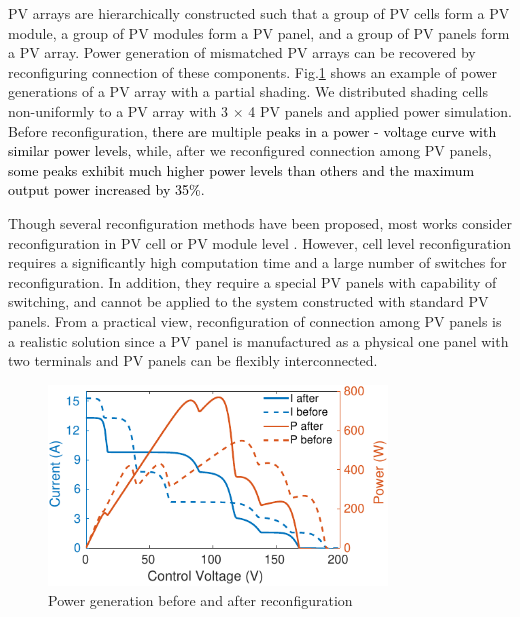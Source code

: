 \documentclass[conference]{pvsctran}
\newcommand{\michiko}{\textcolor{black}}
\newcommand{\zhao}{\textcolor{black}}
\begin{document}

PV arrays are hierarchically constructed such that a group of PV cells form a PV module, a group of PV modules form a PV panel, and a group of PV panels form a PV array. 
Power generation of mismatched PV arrays can be recovered by reconfiguring connection of these components. 
Fig.\ref{compare} shows an example of power generations of a PV array with a partial shading. 
We distributed shading cells non-uniformly to a PV array with 3 $\times$  4 PV panels and applied power simulation. 
Before reconfiguration, \michiko{there are} multiple \michiko{peaks in a power - voltage curve with similar power levels,} while, after we reconfigured connection among PV panels, 
\michiko{some peaks exhibit much higher power levels than others and the }%
\zhao{maximum output power increased by 35\%}.

Though several reconfiguration methods have been proposed, most works consider reconfiguration in PV cell or PV module level \cite{nguyen2008adaptive,wang2014architecture,storey2013improved,storey2014optimized,udenze2018reconfiguration}. 
However, cell level reconfiguration requires a significantly high computation time and a large number of switches for reconfiguration. 
In addition, they require a special PV panels with capability of switching, and cannot be applied to the system constructed with standard PV panels. 
From a practical view, reconfiguration of connection among PV panels is a realistic solution since a PV panel is manufactured as a physical one panel with two terminals and PV panels can be flexibly interconnected. 
\begin{figure}[t]
\centering
\includegraphics[width=9cm]{../fig/compare.png}
\caption{Power generation before and after reconfiguration}
\label{compare}
\end{figure}
\end{document}
